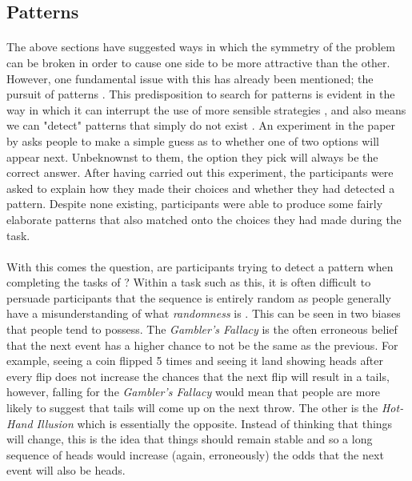 \documentclass[12pt]{article}
\begin{document}
\subsection*{Patterns}

\paragraph{} The above sections have suggested ways in which the symmetry of the problem can be broken in order to cause one side to be more attractive than the other. However, one fundamental issue with this has already been mentioned; the pursuit of patterns \citep{wolford2004searching}. This predisposition to search for patterns is evident in the way in which it can interrupt the use of more sensible strategies \citep{wolford2004searching}, and also means we can "detect" patterns that simply do not exist \cite{yellott1969probability}. An experiment in the paper by \cite{yellott1969probability} asks people to make a simple guess as to whether one of two options will appear next. Unbeknownst to them, the option they pick will always be the correct answer. After having carried out this experiment, the participants were asked to explain how they made their choices and whether they had detected a pattern. Despite none existing, participants were able to produce some fairly elaborate patterns that also matched onto the choices they had made during the task. 

\paragraph{} With this comes the question, are participants trying to detect a pattern when completing the tasks of \cite{clarke2015failure}? Within a task such as this, it is often difficult to persuade participants that the sequence is entirely random as people generally have a misunderstanding of what \textit{randomness} is \citep{Ayton2004}. This can be seen in two biases that people tend to possess. The \textit{Gambler's Fallacy} is the often erroneous belief that the next event has a higher chance to not be the same as the previous. For example, seeing a coin flipped 5 times and seeing it land showing heads after every flip does not increase the chances that the next flip will result in a tails, however, falling for the \textit{Gambler's Fallacy} would mean that people are more likely to suggest that tails will come up on the next throw. The other is the \textit{Hot-Hand Illusion} which is essentially the opposite. Instead of thinking that things will change, this is the idea that things should remain stable and so a long sequence of heads would increase (again, erroneously) the odds that the next event will also be heads.  
\end{document}
